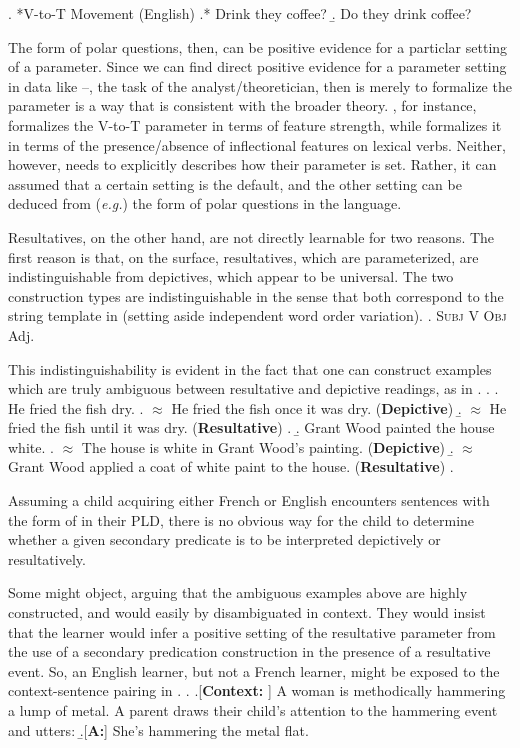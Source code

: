 \documentclass[MilwayThesis]{subfiles}
\begin{document}
\ex. *V-to-T Movement (English)
\a.* Drink they coffee?
\b. Do they drink coffee?

The form of polar questions, then, can be positive evidence for a particlar setting of a parameter.
Since we can find direct positive evidence for a parameter setting in data like \LLast--\Last, the task of the analyst/theoretician, then is merely to formalize the parameter is a way that is consistent with the broader theory.
\textcite{chomsky1995minimalist}, for instance, formalizes the V-to-T parameter in terms of feature strength, while \textcite{lasnik1999verbal} formalizes it in terms of the presence/absence of inflectional features on lexical verbs.
Neither, however, needs to explicitly describes how their parameter is set.
Rather, it can assumed that a certain setting is the default, and the other setting can be deduced from (\textit{e.g.}) the form of polar questions in the language.

Resultatives, on the other hand, are not directly learnable for two reasons.
The first reason is that, on the surface, resultatives, which are parameterized, are indistinguishable from depictives, which appear to be universal.
The two construction types are indistinguishable in the sense that both correspond to the string template in \Next (setting aside independent word order variation).
\ex. \textsc{Subj} V \textsc{Obj} Adj.

This indistinguishability is evident in the fact that one can construct examples which are truly ambiguous between resultative and depictive readings, as in \Next.
\ex. 
\a. He fried the fish dry.
\a. $\approx$ He fried the fish once it was dry. (\textbf{Depictive})
\b. $\approx$ He fried the fish until it was dry. (\textbf{Resultative})
\z.
\b. Grant Wood painted the house white.
\a. $\approx$ The house is white in Grant Wood's painting. (\textbf{Depictive})
\b. $\approx$ Grant Wood applied a coat of white paint to the house. (\textbf{Resultative})
\z.

Assuming a child acquiring either French or English encounters sentences with the form of \LLast in their PLD, there is no obvious way for the child to determine whether a given secondary predicate is to be interpreted depictively or resultatively.

Some might object, arguing that the ambiguous examples above are highly constructed, and would easily by disambiguated in context.
They would insist that the learner would infer a positive setting of the resultative parameter from the use of a secondary predication construction in the presence of a resultative event.
So, an English learner, but not a French learner, might be exposed to the context-sentence pairing in \Next.
\ex. 
\a.[\textbf{Context:} ] A woman is methodically hammering a lump of metal.
A parent draws their child's attention to the hammering event and utters:
\b.[\textbf{A:}] She's hammering the metal flat.
\end{document}
